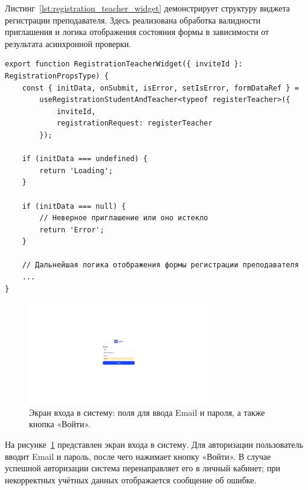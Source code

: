 Листинг~\ref{lst:registration_teacher_widget} демонстрирует структуру виджета регистрации преподавателя. Здесь реализована обработка валидности приглашения и логика отображения состояния формы в зависимости от результата асинхронной проверки.

\begin{lstlisting}[caption={Виджет регистрации преподавателя}, label={lst:registration_teacher_widget}]
export function RegistrationTeacherWidget({ inviteId }: RegistrationPropsType) {
    const { initData, onSubmit, isError, setIsError, formDataRef } =
        useRegistrationStudentAndTeacher<typeof registerTeacher>({
            inviteId,
            registrationRequest: registerTeacher
        });

    if (initData === undefined) {
        return 'Loading';
    }

    if (initData === null) {
        // Неверное приглашение или оно истекло
        return 'Error';
    }

    // Дальнейшая логика отображения формы регистрации преподавателя
    ...
}
\end{lstlisting}

\begin{figure}[H]
    \centering
    \includegraphics[width=0.7\textwidth]{static/presintation/LoginPage.png} %
    \caption{Экран входа в систему: поля для ввода Email и пароля, а также кнопка «Войти».}
    \label{fig:login_page}
\end{figure}

На рисунке~\ref{fig:login_page} представлен экран входа в систему. Для авторизации пользователь вводит Email и пароль, после чего нажимает кнопку «Войти». В случае успешной авторизации система перенаправляет его в личный кабинет; при некорректных учётных данных отображается сообщение об ошибке.

